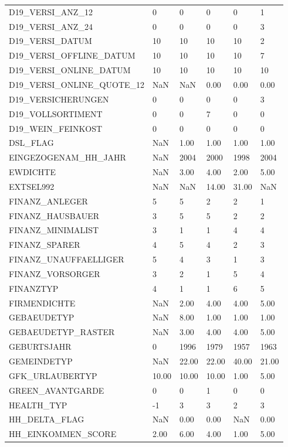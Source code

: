 \begin{longtable}{lp{1cm}p{1cm}p{1cm}p{1cm}p{1cm}}
D19\_VERSI\_ANZ\_12   & 0 & 0 & 0 & 0 & 1 \\
D19\_VERSI\_ANZ\_24   & 0 & 0 & 0 & 0 & 3 \\
D19\_VERSI\_DATUM  &  10 & 10 & 10 & 10 & 2 \\
D19\_VERSI\_OFFLINE\_DATUM   &  10 & 10 & 10 & 10 & 7 \\
D19\_VERSI\_ONLINE\_DATUM  &  10 & 10 & 10 & 10 & 10 \\
D19\_VERSI\_ONLINE\_QUOTE\_12 & NaN & NaN & 0.00 & 0.00 & 0.00 \\
D19\_VERSICHERUNGEN & 0 & 0 & 0 & 0 & 3 \\
D19\_VOLLSORTIMENT  & 0 & 0 & 7 & 0 & 0 \\
D19\_WEIN\_FEINKOST  & 0 & 0 & 0 & 0 & 0 \\
DSL\_FLAG & NaN & 1.00 & 1.00 & 1.00 & 1.00 \\
EINGEZOGENAM\_HH\_JAHR & NaN & 2004 & 2000 & 1998 & 2004 \\
EWDICHTE & NaN & 3.00 & 4.00 & 2.00 & 5.00 \\
EXTSEL992 & NaN & NaN &  14.00 &  31.00 & NaN \\
FINANZ\_ANLEGER   & 5 & 5 & 2 & 2 & 1 \\
FINANZ\_HAUSBAUER   & 3 & 5 & 5 & 2 & 2 \\
FINANZ\_MINIMALIST  & 3 & 1 & 1 & 4 & 4 \\
FINANZ\_SPARER    & 4 & 5 & 4 & 2 & 3 \\
FINANZ\_UNAUFFAELLIGER   & 5 & 4 & 3 & 1 & 3 \\
FINANZ\_VORSORGER   & 3 & 2 & 1 & 5 & 4 \\
FINANZTYP & 4 & 1 & 1 & 6 & 5 \\
FIRMENDICHTE  & NaN & 2.00 & 4.00 & 4.00 & 5.00 \\
GEBAEUDETYP & NaN & 8.00 & 1.00 & 1.00 & 1.00 \\
GEBAEUDETYP\_RASTER & NaN & 3.00 & 4.00 & 4.00 & 5.00 \\
GEBURTSJAHR & 0 & 1996 & 1979 & 1957 & 1963 \\
GEMEINDETYP & NaN &  22.00 &  22.00 &  40.00 &  21.00 \\
GFK\_URLAUBERTYP  &  10.00 &  10.00 &  10.00 & 1.00 & 5.00 \\
GREEN\_AVANTGARDE   & 0 & 0 & 1 & 0 & 0 \\
HEALTH\_TYP &  -1 & 3 & 3 & 2 & 3 \\
HH\_DELTA\_FLAG    & NaN & 0.00 & 0.00 & NaN & 0.00 \\
HH\_EINKOMMEN\_SCORE &   2.00 & 6.00 & 4.00 & 1.00 & 5.00 \\

\end{longtable}
